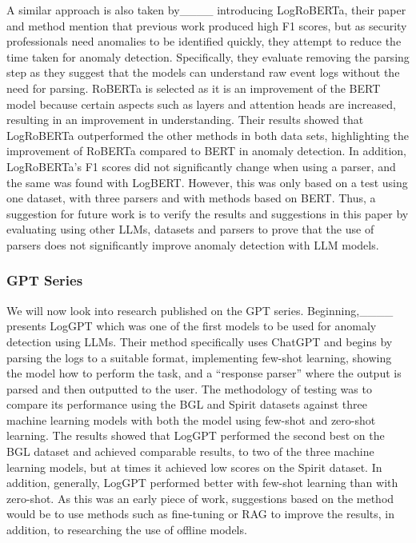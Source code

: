 A similar approach is also taken by____ introducing LogRoBERTa, their paper and method mention that previous work produced high F1 scores, but as security professionals need anomalies to be identified quickly, they attempt to reduce the time taken for anomaly detection. Specifically, they evaluate removing the parsing step as they suggest that the models can understand raw event logs without the need for parsing. RoBERTa is selected as it is an improvement of the BERT model because certain aspects such as layers and attention heads are increased, resulting in an improvement in understanding. Their results showed that LogRoBERTa outperformed the other methods in both data sets, highlighting the improvement of RoBERTa compared to BERT in anomaly detection. In addition, LogRoBERTa's F1 scores did not significantly change when using a parser, and the same was found with LogBERT. However, this was only based on a test using one dataset, with three parsers and with methods based on BERT. Thus, a suggestion for future work is to verify the results and suggestions in this paper by evaluating using other LLMs, datasets and parsers to prove that the use of parsers does not significantly improve anomaly detection with LLM models.

\subsubsection{GPT Series}
We will now look into research published on the GPT series. Beginning,____ presents LogGPT which was one of the first models to be used for anomaly detection using LLMs. Their method specifically uses ChatGPT and begins by parsing the logs to a suitable format, implementing few-shot learning, showing the model how to perform the task, and a ``response parser'' where the output is parsed and then outputted to the user. The methodology of testing was to compare its performance using the BGL and Spirit datasets against three machine learning models with both the model using few-shot and zero-shot learning. The results showed that LogGPT performed the second best on the BGL dataset and achieved comparable results, to two of the three machine learning models, but at times it achieved low scores on the Spirit dataset. In addition, generally, LogGPT performed better with few-shot learning than with zero-shot. As this was an early piece of work, suggestions based on the method would be to use methods such as fine-tuning or RAG to improve the results, in addition, to researching the use of offline models. 

